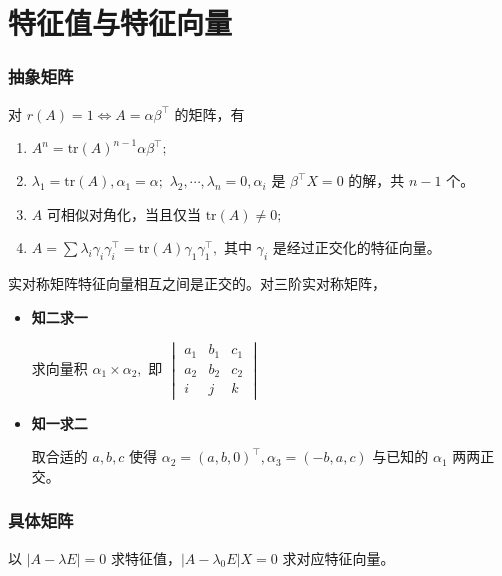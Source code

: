 \chapter*{特征值与特征向量}


\subsection{抽象矩阵}

对 $ r(A) = 1 \Leftrightarrow A =\alpha\beta^\top $ 的矩阵，有

\begin{enumerate}
    \item $ A^n = \textrm{tr}(A)^{n-1}\alpha\beta^\top; $ 
    \item $ \lambda_1 = \textrm{tr}(A), \alpha_1 = \alpha; $ 
    $ \lambda_2,\cdots,\lambda_n = 0, \alpha_i $ 是 $ \beta^\top X = 0 $ 的解，共 $ n - 1 $ 个。
    \item $ A $ 可相似对角化，当且仅当 $ \textrm{tr}(A) \neq 0; $ 
    \item $ A = \sum \lambda_i\gamma_i\gamma_i^\top = \textrm{tr}(A)\gamma_1\gamma_1^\top, $ 
    其中 $ \gamma_i $ 是经过正交化的特征向量。
\end{enumerate}

实对称矩阵特征向量相互之间是正交的。对三阶实对称矩阵，
\begin{itemize}
    \item \textbf{知二求一}
    
    求向量积 $ \alpha_1\times \alpha_2, $ 即 
    $ \begin{vmatrix}
        a_1&b_1&c_1\\ a_2&b_2&c_2\\ i&j&k
    \end{vmatrix} $ 
    \item \textbf{知一求二}
    
    取合适的 $ a,b,c $ 使得 $ \alpha_2 = (a, b, 0)^\top, \alpha_3 = (-b, a, c) $ 与已知的 $ \alpha_1 $ 
    两两正交。
\end{itemize}

\subsection{具体矩阵}

以 $ |A - \lambda E| = 0 $ 求特征值，$ |A-\lambda_0 E|X = 0 $ 求对应特征向量。


